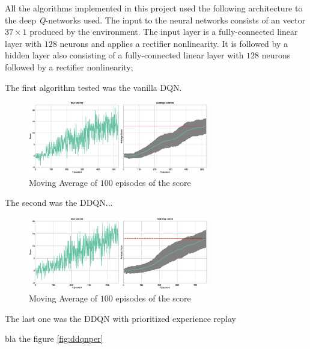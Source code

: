 \documentclass[a4paper]{article}
\begin{document}
All the algorithms implemented in this project used the following architecture to the deep \textit{Q}-networks used. The input to the neural networks consists of an vector $37 \times 1$ produced by the environment. The input layer is a fully-connected linear layer with $128$ neurons and applies a rectifier nonlinearity. It is followed by a hidden layer also consisting of a fully-connected linear layer with $128$ neurons followed by a rectifier nonlinearity;




The first algorithm tested was the vanilla DQN. 

\begin{figure}[ht]
\centering
\includegraphics[width=0.7\textwidth]{../notebooks/figures/2018-08-24-dqn.eps}
\caption{Moving Average of $100$ episodes of the score}
\label{fig:dqn}
\end{figure}


The second was the DDQN...

\begin{figure}[ht]
\centering
\includegraphics[width=0.7\textwidth]{../notebooks/figures/2018-08-24-ddqn-learning-curve.eps}
\caption{Moving Average of $100$ episodes of the score}
\label{fig:ddqn}
\end{figure}

The last one was the DDQN with prioritized experience replay

bla the figure \ref{fig:ddqnper}
\end{document}
